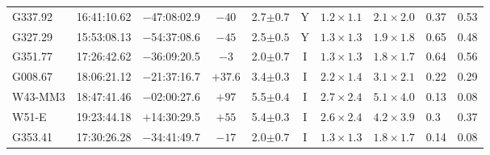 \documentclass[longauth]{aa} %
\begin{document}
\begin{table}[htp]
\begin{threeparttable}[c]
\begin{tabular}{lcccccllll}
G337.92         %
    & 16:41:10.62 & $-$47:08:02.9 & $-40$   & 2.7$\pm 0.7$  %
    & Y & $1.2 \times 1.1$      & $2.1 \times 2.0$ & 0.37 & 0.53\\ %
    
G327.29     %
    & 15:53:08.13 & $-$54:37:08.6 & $-45$   & 2.5$\pm 0.5$  %
    & Y & $1.3 \times 1.3$      & $1.9 \times 1.8$ & 0.65 & 0.48\\ 
       
\hline

G351.77    
    & 17:26:42.62 & $-$36:09:20.5 & $-3$   & 2.0$\pm 0.7$  %
    &  I & $1.3 \times 1.3$    & $1.8 \times 1.7$ & 0.64 & 0.56\\
    
G008.67     
    & 18:06:21.12 & $-$21:37:16.7 & $+37.6$   & 3.4$\pm 0.3$  %
    & I &  $2.2 \times 1.4$     & $3.1 \times 2.1$  &0.22 &0.29  \\ 
    

W43-MM3     %
    & 18:47:41.46 & $-$02:00:27.6 & $+97$   & 5.5$\pm 0.4$ %
    & I &  $2.7 \times 2.4$     & $5.1 \times 4.0$ &0.13 & 0.08  \\
    
W51-E       %
    & 19:23:44.18 & $+$14:30:29.5 & $+55$   & 5.4$\pm 0.3$  %
    & I & $2.6 \times 2.4$      & $4.2 \times 3.9$ & 0.3 & 0.37 \\ 
    
G353.41     %
    & 17:30:26.28 & $-$34:41:49.7 & $-17$   & 2.0$\pm 0.7$  %
    &  I & $1.3 \times 1.3$ &  $1.8 \times 1.7$ & 0.14 & 0.08  \\


\end{tabular}
\end{threeparttable}
\end{table}
\end{document}
